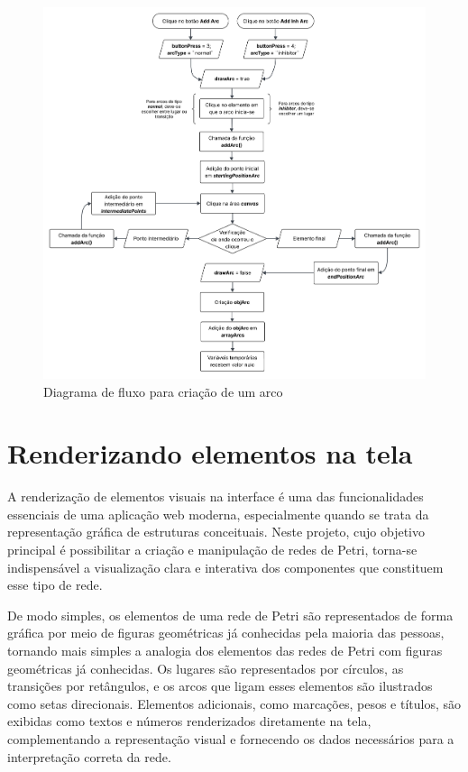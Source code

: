 \documentclass[
	12pt,				%
	openright,			%
	oneside,			%
	a4paper,			%
	english,			%
	brazil				%
	]{abntex2}
\begin{document}
\begin{figure}[ht] 
	\centering
	\includegraphics[scale=0.12]{figuras/diagrama-fluxo-addArc.png}
	\caption[Diagrama de fluxo para criação de um Arco]{Diagrama de fluxo para criação de um arco}
	\label{fig:addArcDiagram}
\end{figure}
\FloatBarrier

\section{Renderizando elementos na tela}

A renderização de elementos visuais na interface é uma das funcionalidades essenciais de uma aplicação web moderna, especialmente quando se trata da representação gráfica de estruturas conceituais. Neste projeto, cujo objetivo principal é possibilitar a criação e manipulação de redes de Petri, torna-se indispensável a visualização clara e interativa dos componentes que constituem esse tipo de rede.

De modo simples, os elementos de uma rede de Petri são representados de forma gráfica por meio de figuras geométricas já conhecidas pela maioria das pessoas, tornando mais simples a analogia dos elementos das redes de Petri com figuras geométricas já conhecidas. Os lugares são representados por círculos, as transições por retângulos, e os arcos que ligam esses elementos são ilustrados como setas direcionais. Elementos adicionais, como marcações, pesos e títulos, são exibidas como textos e números renderizados diretamente na tela, complementando a representação visual e fornecendo os dados necessários para a interpretação correta da rede.
\end{document}
